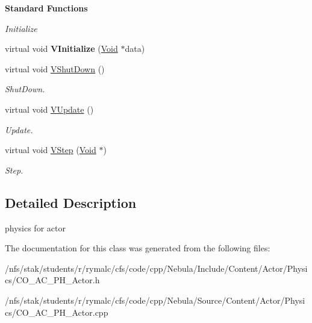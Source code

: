 \begin{Indent}{\bf Standard Functions}\par
{\em \label{_amgrp73a6f6f6732ceea086632f66fc34a9e7}
 Initialize }\begin{DoxyCompactItemize}
\item 
\hypertarget{classContent_1_1Actor_1_1Physics_1_1Actor_a55033240f79ea500e53c7bbc1a203436}{
virtual void {\bfseries VInitialize} (\hyperlink{structVoid}{Void} $\ast$data)}
\label{classContent_1_1Actor_1_1Physics_1_1Actor_a55033240f79ea500e53c7bbc1a203436}

\item 
\hypertarget{classContent_1_1Actor_1_1Physics_1_1Actor_a40448d84782f6910f4312b734d367531}{
virtual void \hyperlink{classContent_1_1Actor_1_1Physics_1_1Actor_a40448d84782f6910f4312b734d367531}{VShutDown} ()}
\label{classContent_1_1Actor_1_1Physics_1_1Actor_a40448d84782f6910f4312b734d367531}

\begin{DoxyCompactList}\small\item\em ShutDown. \item\end{DoxyCompactList}\item 
\hypertarget{classContent_1_1Actor_1_1Physics_1_1Actor_ab6eb6a7ad6c2bfe382c8f0ef29ccf91f}{
virtual void \hyperlink{classContent_1_1Actor_1_1Physics_1_1Actor_ab6eb6a7ad6c2bfe382c8f0ef29ccf91f}{VUpdate} ()}
\label{classContent_1_1Actor_1_1Physics_1_1Actor_ab6eb6a7ad6c2bfe382c8f0ef29ccf91f}

\begin{DoxyCompactList}\small\item\em Update. \item\end{DoxyCompactList}\item 
\hypertarget{classContent_1_1Actor_1_1Physics_1_1Actor_a68d2ca50765c2111c0d965b8fcb038ac}{
virtual void \hyperlink{classContent_1_1Actor_1_1Physics_1_1Actor_a68d2ca50765c2111c0d965b8fcb038ac}{VStep} (\hyperlink{structVoid}{Void} $\ast$)}
\label{classContent_1_1Actor_1_1Physics_1_1Actor_a68d2ca50765c2111c0d965b8fcb038ac}

\begin{DoxyCompactList}\small\item\em Step. \item\end{DoxyCompactList}\end{DoxyCompactItemize}
\end{Indent}


\subsection{Detailed Description}
physics for actor 

The documentation for this class was generated from the following files:\begin{DoxyCompactItemize}
\item 
/nfs/stak/students/r/rymalc/cfs/code/cpp/Nebula/Include/Content/Actor/Physics/CO\_\-AC\_\-PH\_\-Actor.h\item 
/nfs/stak/students/r/rymalc/cfs/code/cpp/Nebula/Source/Content/Actor/Physics/CO\_\-AC\_\-PH\_\-Actor.cpp\end{DoxyCompactItemize}
